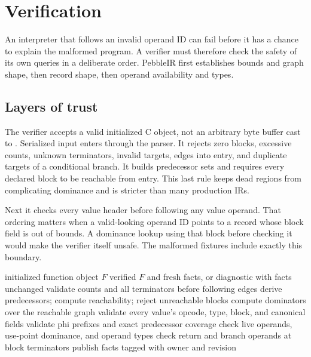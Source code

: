 \chapter{Verification}
\label{ch:pebble-verification}

An interpreter that follows an invalid operand ID can fail before it has a chance to explain the malformed program.
A verifier must therefore check the safety of its own queries in a deliberate order.
PebbleIR first establishes bounds and graph shape, then record shape, then operand availability and types.

\section{Layers of trust}
\label{sec:pebble-verification-layers}
The verifier accepts a valid initialized C object, not an arbitrary byte buffer cast to .
Serialized input enters through the parser.
It rejects zero blocks, excessive counts, unknown terminators, invalid targets, edges into entry, and duplicate targets of a conditional branch.
It builds predecessor sets and requires every declared block to be reachable from entry.
This last rule keeps dead regions from complicating dominance and is stricter than many production IRs.

Next it checks every value header before following any value operand.
That ordering matters when a valid-looking operand ID points to a record whose block field is out of bounds.
A dominance lookup using that block before checking it would make the verifier itself unsafe.
The malformed fixtures include exactly this boundary.

\begin{algorithm}[htbp]
\caption{Verifying in dependency order.}
\label{alg:pebble-verify}
\begin{pseudocode}
\Require initialized function object $F$
\Ensure verified $F$ and fresh facts, or diagnostic with facts unchanged
\State validate counts and all terminators before following edges
\State derive predecessors; compute reachability; reject unreachable blocks
\State compute dominators over the reachable graph
\State validate every value's opcode, type, block, and canonical fields
\State validate phi prefixes and exact predecessor coverage
\State check live operands, use-point dominance, and operand types
\State check return and branch operands at block terminators
\State publish facts tagged with owner and revision
\end{pseudocode}
\end{algorithm}

